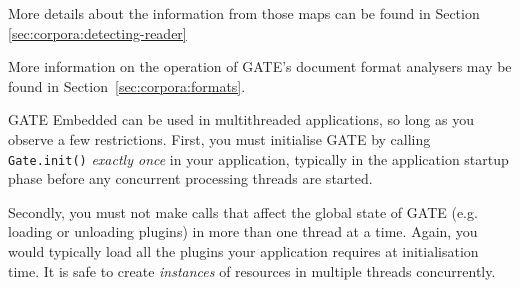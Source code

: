 More details about the information from those maps can be found in
Section \ref{sec:corpora:detecting-reader}

More information on the operation of GATE's document format analysers may be
found in Section~\ref{sec:corpora:formats}.



GATE Embedded can be used in multithreaded applications, so long as
you observe a few restrictions.  First, you must initialise GATE by
calling \texttt{Gate.init()} {\em exactly once} in your application,
typically in the application startup phase before any concurrent
processing threads are started.

Secondly, you must not make calls that affect the global state of GATE (e.g.
loading or unloading plugins) in more than one thread at a time.  Again, you
would typically load all the plugins your application requires at
initialisation time.  It is safe to create {\em instances} of resources in
multiple threads concurrently.

